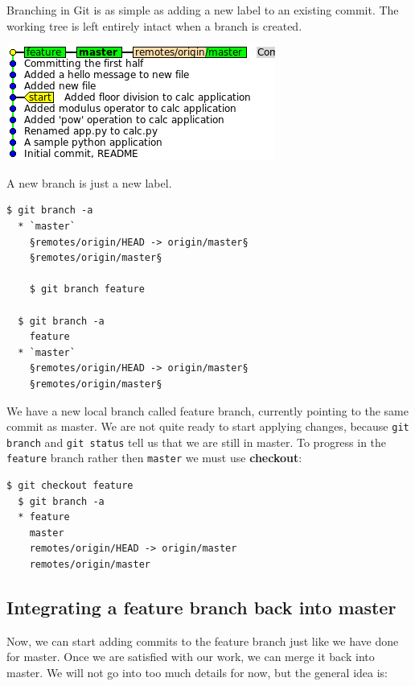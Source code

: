 \documentclass{../common/tufte-latex/tufte-handout}
\begin{document}
Branching in Git is as simple as adding a new label to an existing commit.
The working tree is left entirely intact when a branch is created.
\begin{marginfigure}%
  \centering
  \includegraphics[width=\linewidth]{gitbranch-feature.png}
  \label{fig:gitbranch-feature}
  \caption{A new branch is just a new label.}
\end{marginfigure}
\begin{lstlisting}[style=BashInputStyle]
  $ git branch -a
  * `master`
    §remotes/origin/HEAD -> origin/master§
    §remotes/origin/master§

    $ git branch feature

  $ git branch -a
    feature
  * `master`
    §remotes/origin/HEAD -> origin/master§
    §remotes/origin/master§
\end{lstlisting}

We have a new local branch called feature branch, currently pointing to the same commit as master.
We are not quite ready to start applying changes, because \texttt{git branch} and \texttt{git status} tell us that we are still in master.
To progress in the \texttt{feature} branch rather then \texttt{master} we must use \textbf{checkout}:

\begin{lstlisting}[style=BashInputStyle]
  $ git checkout feature
  $ git branch -a
  * feature
    master
    remotes/origin/HEAD -> origin/master
    remotes/origin/master
\end{lstlisting}

\subsection{Integrating a feature branch back into master}

Now, we can start adding commits to the feature branch just like we have done for master.
Once we are satisfied with our work, we can merge it back into master.
We will not go into too much details for now, but the general idea is:
\end{document}
